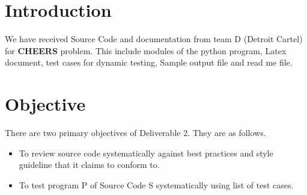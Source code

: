 \section{Introduction}
 We have received Source Code and documentation from team D (Detroit Cartel) for \textbf {CHEERS} problem. This include modules of the python program, Latex document, test cases for dynamic testing, Sample output file and read me file. 
 \section{Objective}

 There are two primary objectives of Deliverable 2. They are as follows.
 \begin{itemize}
    \item To review source code systematically against best practices and style guideline that it claims to conform to.
    \item To test program P of Source Code S systematically using list of test cases.
 \end{itemize}
   